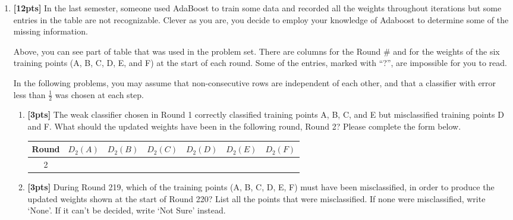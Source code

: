 \documentclass[11pt,addpoints,answers]{exam}
\begin{document}
\begin{enumerate}
    \item \textbf{[12pts]} In the last semester, someone used AdaBoost to train some data and recorded all the weights throughout iterations but some entries in the table are not recognizable. Clever as you are, you decide to employ your knowledge of Adaboost to determine some of the missing information.
    
    Above, you can see part of table that was used in the problem set. There are columns for the Round \# and for the weights of the six training points (A, B, C, D, E, and F) at the start of each round. Some of the entries, marked with “?”, are impossible for you to read.
    

    

In the following problems, you may assume that non-consecutive rows are independent of each other, and that a classifier with error less than $\frac{1}{2}$ was chosen at each step.

   \begin{enumerate}
        \item \textbf{[3pts]}  The weak classifier chosen in Round 1 correctly classified training points A, B, C, and E but misclassified training points D and F. What should the updated weights have been in the following round, Round 2? Please complete the form below.
   
\begin{table}[h!]
\begin{center}
\begin{tabular}{ |c|c|c|c|c|c|c| } 
 \hline
 Round & $D_2(A)$ & $D_2(B)$ & $D_2(C)$ & $D_2(D)$ & $D_2(E)$ & $D_2(F)$\\ [4pt]
  \hline
  \hline
 2 &   &  &   &   &   &   \\ [4pt]
\hline
\end{tabular}
\end{center}
\end{table}  

    \item \textbf{[3pts]} During Round 219, which of the training points (A, B, C, D, E, F) must have been misclassified, in order to produce the updated weights shown at the start of Round 220? List all the points that were misclassified. If none were misclassified, write `None'. If it can't be decided, write `Not Sure' instead.
    
    \begin{tcolorbox}[fit,height=1cm, width=6cm, blank, borderline={1pt}{-2pt},nobeforeafter]
    \end{tcolorbox}\\


\end{enumerate}
\end{enumerate}
\end{document}
